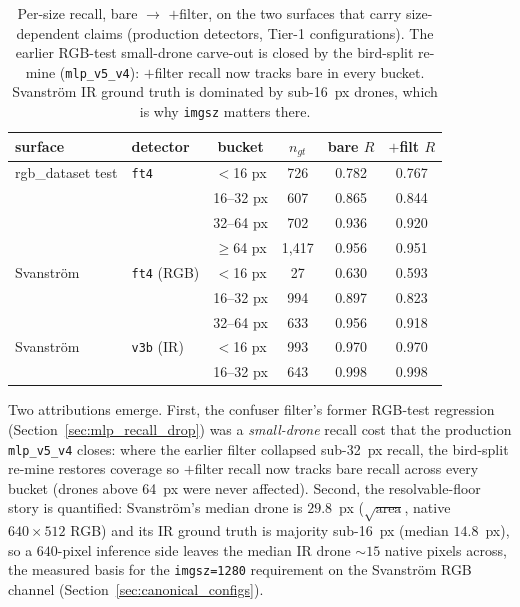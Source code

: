 \begin{table}[htbp]
    \centering
    \caption{Per-size recall, bare $\to$ $+$filter, on the two surfaces that carry size-dependent claims (production detectors, Tier-1 configurations). The earlier RGB-test small-drone carve-out is closed by the bird-split re-mine (\texttt{mlp\_v5\_v4}): $+$filter recall now tracks bare in every bucket. Svanstr\"om IR ground truth is dominated by sub-16~px drones, which is why \texttt{imgsz} matters there.}
    \label{tab:per_size}
    \begin{tabular}{llcccc}
        \toprule
        surface & detector & bucket & $n_{gt}$ & bare $R$ & $+$filt $R$ \\
        \midrule
        rgb\_dataset test & \texttt{ft4}  & $<$16 px  & 726   & 0.782 & 0.767 \\
                          &               & 16--32 px & 607   & 0.865 & 0.844 \\
                          &               & 32--64 px & 702   & 0.936 & 0.920 \\
                          &               & $\geq$64 px & 1{,}417 & 0.956 & 0.951 \\
        \midrule
        Svanstr\"om       & \texttt{ft4} (RGB)  & $<$16 px  & 27    & 0.630 & 0.593 \\
                          &               & 16--32 px & 994   & 0.897 & 0.823 \\
                          &               & 32--64 px & 633   & 0.956 & 0.918 \\
        \midrule
        Svanstr\"om       & \texttt{v3b} (IR)   & $<$16 px  & 993   & 0.970 & 0.970 \\
                          &               & 16--32 px & 643   & 0.998 & 0.998 \\
        \bottomrule
    \end{tabular}
\end{table}

Two attributions emerge. First, the confuser filter's former RGB-test regression (Section~\ref{sec:mlp_recall_drop}) was a \emph{small-drone} recall cost that the production \texttt{mlp\_v5\_v4} closes: where the earlier filter collapsed sub-32~px recall, the bird-split re-mine restores coverage so $+$filter recall now tracks bare recall across every bucket (drones above 64~px were never affected). Second, the resolvable-floor story is quantified: Svanstr\"om's median drone is $29.8$~px ($\sqrt{\text{area}}$, native $640{\times}512$ RGB) and its IR ground truth is majority sub-16~px (median $14.8$~px), so a $640$-pixel inference side leaves the median IR drone ${\sim}15$ native pixels across, the measured basis for the \texttt{imgsz=1280} requirement on the Svanstr\"om RGB channel (Section~\ref{sec:canonical_configs}).

